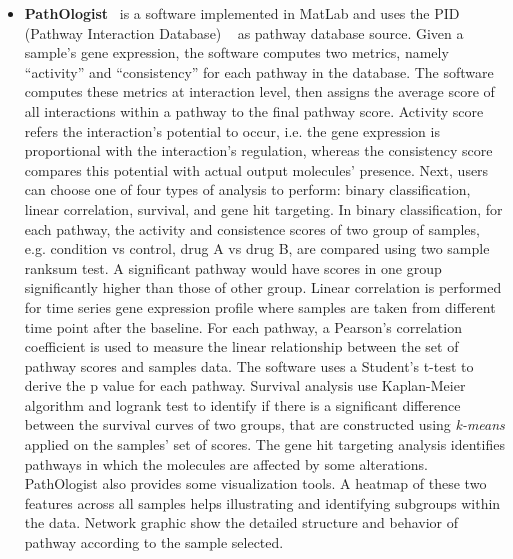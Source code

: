 \begin{itemize}
\item \textbf{PathOlogist}~\cite{Greenblum:2011} is a software implemented in MatLab  and uses the PID (Pathway Interaction Database) ~\cite{Schaefer:2009qf} as pathway database source.
Given a sample's gene expression, the software computes two metrics, namely ``activity'' and ``consistency'' for each pathway in the database. 
The software computes these metrics at interaction level, then assigns the average score of all interactions within a pathway to the final pathway score.
Activity score refers the interaction's potential to occur, i.e. the gene expression is proportional with the interaction's regulation, whereas the consistency score compares this potential with actual output molecules' presence.
Next, users can choose one of four types of analysis to perform: binary classification, linear correlation, survival, and gene hit targeting. 
In binary classification, for each pathway, the activity and consistence scores of two group of samples, e.g. condition vs control, drug A vs drug B, are compared using two sample ranksum test. A significant pathway would have scores in one group significantly higher than those of other group. 
Linear correlation is performed for time series gene expression profile where samples are taken from different time point after the baseline. For each pathway, a Pearson's correlation coefficient is used to measure the linear relationship between the set of pathway scores and samples data. The software uses a Student's t-test to derive the p value for each pathway. 
Survival analysis use Kaplan-Meier algorithm and logrank test to identify if there is a significant difference between the survival curves of two groups, that are constructed using \textit{k-means} applied on the samples' set of scores.
The gene hit targeting analysis identifies pathways in which the molecules are affected by some alterations.
PathOlogist also provides some visualization tools. A heatmap of these two features across all samples helps illustrating and identifying subgroups within the data. Network graphic show the detailed structure and behavior of pathway according to the sample selected.


\end{itemize}

